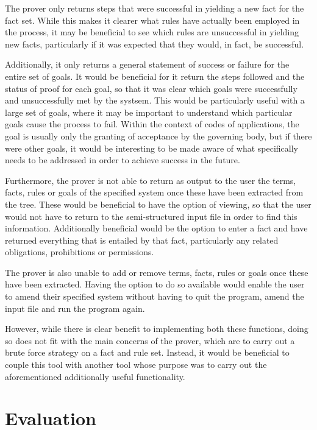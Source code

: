 \documentclass{l4proj}
\begin{document}
The prover only returns steps that were successful in yielding a new fact for the fact set. While this makes it clearer what rules have actually been employed in the process, it may be beneficial to see which rules are unsuccessful in yielding new facts, particularly if it was expected that they would, in fact, be successful. 

Additionally, it only returns a general statement of success or failure for the entire set of goals. It would be beneficial for it return the steps followed and the status of proof for each goal, so that it was clear which goals were successfully and unsuccessfully met by the systsem. This would be particularly useful with a large set of goals, where it may be important to understand which particular goals cause the process to fail. Within the context of codes of applications, the goal is usually only the granting of acceptance by the governing body, but if there were other goals, it would be interesting to be made aware of what specifically needs to be addressed in order to achieve success in the future. 

Furthermore, the prover is not able to return as output to the user the terms, facts, rules or goals of the specified system once these have been extracted from the tree. These would be beneficial to have the option of viewing, so that the user would not have to return to the semi-structured input file in order to find this information. Additionally beneficial would be the option to enter a fact and have returned everything that is entailed by that fact, particularly any related obligations, prohibitions or permissions. 

The prover is also unable to add or remove terms, facts, rules or goals once these have been extracted. Having the option to do so available would enable the user to amend their specified system without having to quit the program, amend the input file and run the program again. 

However, while there is clear benefit to implementing both these functions, doing so does not fit with the main concerns of the prover, which are to carry out a brute force strategy on a fact and rule set. Instead, it would be beneficial to couple this tool with another tool whose purpose was to carry out the aforementioned additionally useful functionality. 
\chapter{Evaluation}
\end{document}
